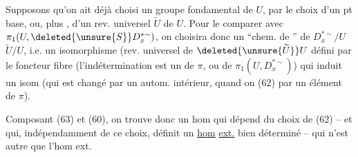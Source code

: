 Supposons qu'on ait déjà choisi  un groupe fondamental  de $U$, par le choix d'un pt base, ou, plus , d'un rev. universel $\widetilde U$ de $U$.
Pour le comparer avec $\pi_1(U,\deleted{\unsure{S}}D_x^{*\sim})$, on choisira donc un ``chem. de '' de $D_x^{*\sim}/U$  $\widetilde U/U$, i.e. un isomorphisme
(rev. universel de $\deleted{\unsure{\widetilde U}}U$ défini par le foncteur fibre
(l'indétermination est  un    de $\pi$, ou de $\pi_1(U,D_x^{*\sim})$) qui induit un isom
(qui est changé par un autom. intérieur, quand on  (62) par un élément de $\pi$).

Composant (63) et (60), on trouve donc un hom
qui dépend du choix de (62) -- et qui, indépendamment de ce choix, définit un \uline{hom} \uline{ext.} bien déterminé -- qui n'est autre que l'hom ext.

